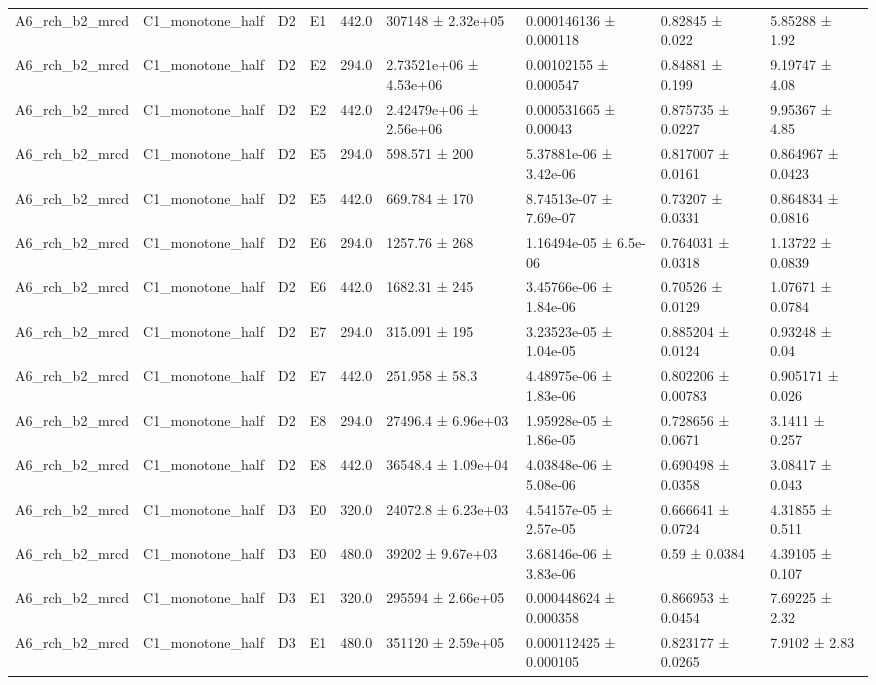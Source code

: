 \begin{table}
\begin{tabular}{lllllllll}
A6\_rch\_b2\_mrcd & C1\_monotone\_half & D2 & E1 & 442.0 & 307148 ± 2.32e+05 & 0.000146136 ± 0.000118 & 0.82845 ± 0.022 & 5.85288 ± 1.92 \\
A6\_rch\_b2\_mrcd & C1\_monotone\_half & D2 & E2 & 294.0 & 2.73521e+06 ± 4.53e+06 & 0.00102155 ± 0.000547 & 0.84881 ± 0.199 & 9.19747 ± 4.08 \\
A6\_rch\_b2\_mrcd & C1\_monotone\_half & D2 & E2 & 442.0 & 2.42479e+06 ± 2.56e+06 & 0.000531665 ± 0.00043 & 0.875735 ± 0.0227 & 9.95367 ± 4.85 \\
A6\_rch\_b2\_mrcd & C1\_monotone\_half & D2 & E5 & 294.0 & 598.571 ± 200 & 5.37881e-06 ± 3.42e-06 & 0.817007 ± 0.0161 & 0.864967 ± 0.0423 \\
A6\_rch\_b2\_mrcd & C1\_monotone\_half & D2 & E5 & 442.0 & 669.784 ± 170 & 8.74513e-07 ± 7.69e-07 & 0.73207 ± 0.0331 & 0.864834 ± 0.0816 \\
A6\_rch\_b2\_mrcd & C1\_monotone\_half & D2 & E6 & 294.0 & 1257.76 ± 268 & 1.16494e-05 ± 6.5e-06 & 0.764031 ± 0.0318 & 1.13722 ± 0.0839 \\
A6\_rch\_b2\_mrcd & C1\_monotone\_half & D2 & E6 & 442.0 & 1682.31 ± 245 & 3.45766e-06 ± 1.84e-06 & 0.70526 ± 0.0129 & 1.07671 ± 0.0784 \\
A6\_rch\_b2\_mrcd & C1\_monotone\_half & D2 & E7 & 294.0 & 315.091 ± 195 & 3.23523e-05 ± 1.04e-05 & 0.885204 ± 0.0124 & 0.93248 ± 0.04 \\
A6\_rch\_b2\_mrcd & C1\_monotone\_half & D2 & E7 & 442.0 & 251.958 ± 58.3 & 4.48975e-06 ± 1.83e-06 & 0.802206 ± 0.00783 & 0.905171 ± 0.026 \\
A6\_rch\_b2\_mrcd & C1\_monotone\_half & D2 & E8 & 294.0 & 27496.4 ± 6.96e+03 & 1.95928e-05 ± 1.86e-05 & 0.728656 ± 0.0671 & 3.1411 ± 0.257 \\
A6\_rch\_b2\_mrcd & C1\_monotone\_half & D2 & E8 & 442.0 & 36548.4 ± 1.09e+04 & 4.03848e-06 ± 5.08e-06 & 0.690498 ± 0.0358 & 3.08417 ± 0.043 \\
A6\_rch\_b2\_mrcd & C1\_monotone\_half & D3 & E0 & 320.0 & 24072.8 ± 6.23e+03 & 4.54157e-05 ± 2.57e-05 & 0.666641 ± 0.0724 & 4.31855 ± 0.511 \\
A6\_rch\_b2\_mrcd & C1\_monotone\_half & D3 & E0 & 480.0 & 39202 ± 9.67e+03 & 3.68146e-06 ± 3.83e-06 & 0.59 ± 0.0384 & 4.39105 ± 0.107 \\
A6\_rch\_b2\_mrcd & C1\_monotone\_half & D3 & E1 & 320.0 & 295594 ± 2.66e+05 & 0.000448624 ± 0.000358 & 0.866953 ± 0.0454 & 7.69225 ± 2.32 \\
A6\_rch\_b2\_mrcd & C1\_monotone\_half & D3 & E1 & 480.0 & 351120 ± 2.59e+05 & 0.000112425 ± 0.000105 & 0.823177 ± 0.0265 & 7.9102 ± 2.83 \\

\end{tabular}
\end{table}
